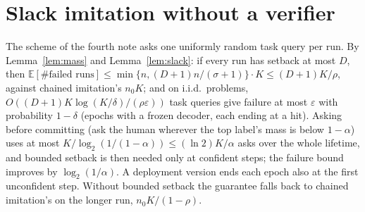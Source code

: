 \documentclass[11pt]{article}
\theoremstyle{definition}
\theoremstyle{remark}
\newcommand{\K}{K}
\newcommand{\Ex}{\mathbb{E}}
\begin{document}
\appendix

\section{Slack imitation without a verifier}\label{app:slack}

The scheme of the fourth note asks one uniformly random task query per run. By Lemma~\ref{lem:mass} and Lemma~\ref{lem:slack}: if every run has setback at most $D$, then $\Ex[\#\text{failed runs}]\le\min\{n,(D+1)n/(\sigma+1)\}\cdot\K\le(D+1)\K/\rho$, against chained imitation's $n_0\K$; and on i.i.d.\ problems, $O((D+1)\K\log(\K/\delta)/(\rho\varepsilon))$ task queries give failure at most $\varepsilon$ with probability $1-\delta$ (epochs with a frozen decoder, each ending at a hit). Asking before committing (ask the human wherever the top label's mass is below $1-\alpha$) uses at most $\K/\log_2(1/(1-\alpha))\le(\ln2)\K/\alpha$ asks over the whole lifetime, and bounded setback is then needed only at confident steps; the failure bound improves by $\log_2(1/\alpha)$. A deployment version ends each epoch also at the first unconfident step. Without bounded setback the guarantee falls back to chained imitation's on the longer run, $n_0\K/(1-\rho)$.
\end{document}
